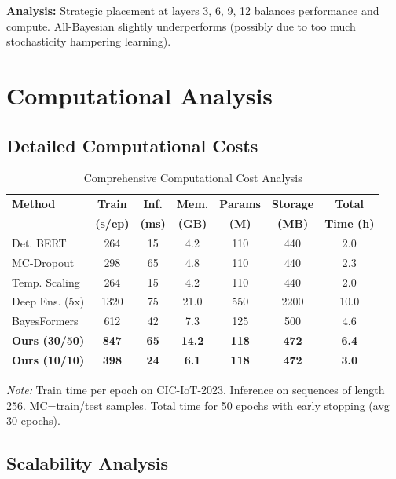 \documentclass[12pt,a4paper]{article}
\theoremstyle{definition}
\begin{document}
\textbf{Analysis:} Strategic placement at layers 3, 6, 9, 12 balances performance and compute. All-Bayesian slightly underperforms (possibly due to too much stochasticity hampering learning).

\section{Computational Analysis}
\label{app:computational}

\subsection{Detailed Computational Costs}

\begin{table}[H]
\caption{Comprehensive Computational Cost Analysis}
\label{tab:computational_full}
\centering
\footnotesize
\setlength{\tabcolsep}{3pt}
\begin{tabular}{@{}lcccccc@{}}
\toprule
\textbf{Method} & \textbf{Train} & \textbf{Inf.} & \textbf{Mem.} & \textbf{Params} & \textbf{Storage} & \textbf{Total} \\
& \textbf{(s/ep)} & \textbf{(ms)} & \textbf{(GB)} & \textbf{(M)} & \textbf{(MB)} & \textbf{Time (h)} \\
\midrule
Det. BERT & 264 & 15 & 4.2 & 110 & 440 & 2.0 \\
MC-Dropout & 298 & 65 & 4.8 & 110 & 440 & 2.3 \\
Temp. Scaling & 264 & 15 & 4.2 & 110 & 440 & 2.0 \\
Deep Ens. (5x) & 1320 & 75 & 21.0 & 550 & 2200 & 10.0 \\
BayesFormers & 612 & 42 & 7.3 & 125 & 500 & 4.6 \\
\midrule
\textbf{Ours (30/50)} & \textbf{847} & \textbf{65} & \textbf{14.2} & \textbf{118} & \textbf{472} & \textbf{6.4} \\
\textbf{Ours (10/10)} & \textbf{398} & \textbf{24} & \textbf{6.1} & \textbf{118} & \textbf{472} & \textbf{3.0} \\
\bottomrule
\end{tabular}
\parbox{\columnwidth}{\footnotesize \textit{Note:} Train time per epoch on CIC-IoT-2023. Inference on sequences of length 256. MC=train/test samples. Total time for 50 epochs with early stopping (avg 30 epochs).}
\end{table}

\subsection{Scalability Analysis}
\end{document}
